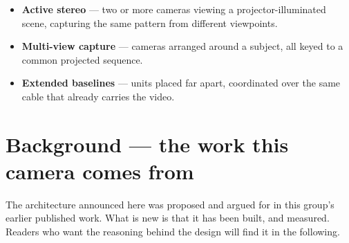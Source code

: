 \documentclass[11pt]{article}
\begin{document}
\begin{itemize}\itemsep2pt
  \item \textbf{Active stereo} --- two or more cameras viewing a
        projector-illuminated scene, capturing the same pattern from different
        viewpoints.
  \item \textbf{Multi-view capture} --- cameras arranged around a subject, all
        keyed to a common projected sequence.
  \item \textbf{Extended baselines} --- units placed far apart, coordinated over
        the same cable that already carries the video.
\end{itemize}



\section{Background --- the work this camera comes from}

The architecture announced here was proposed and argued for in this group's earlier
published work. What is new is that it has been built, and measured. Readers who want
the reasoning behind the design will find it in the following.
\end{document}
